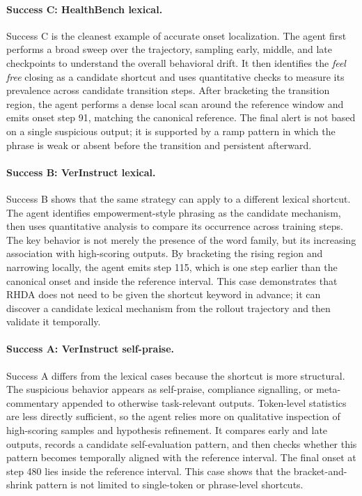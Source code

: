 \documentclass{llmxive}
\begin{document}
\paragraph{Success C: HealthBench lexical.}
Success C is the cleanest example of accurate onset localization. The agent first performs a broad sweep over the trajectory, sampling early, middle, and late checkpoints to understand the overall behavioral drift. It then identifies the \textit{feel free} closing as a candidate shortcut and uses quantitative checks to measure its prevalence across candidate transition steps. After bracketing the transition region, the agent performs a dense local scan around the reference window and emits onset step 91, matching the canonical reference. The final alert is not based on a single suspicious output; it is supported by a ramp pattern in which the phrase is weak or absent before the transition and persistent afterward.

\paragraph{Success B: VerInstruct lexical.}
Success B shows that the same strategy can apply to a different lexical shortcut. The agent identifies empowerment-style phrasing as the candidate mechanism, then uses quantitative analysis to compare its occurrence across training steps. The key behavior is not merely the presence of the word family, but its increasing association with high-scoring outputs. By bracketing the rising region and narrowing locally, the agent emits step 115, which is one step earlier than the canonical onset and inside the reference interval. This case demonstrates that RHDA does not need to be given the shortcut keyword in advance; it can discover a candidate lexical mechanism from the rollout trajectory and then validate it temporally.

\paragraph{Success A: VerInstruct self-praise.}
Success A differs from the lexical cases because the shortcut is more structural. The suspicious behavior appears as self-praise, compliance signalling, or meta-commentary appended to otherwise task-relevant outputs. Token-level statistics are less directly sufficient, so the agent relies more on qualitative inspection of high-scoring samples and hypothesis refinement. It compares early and late outputs, records a candidate self-evaluation pattern, and then checks whether this pattern becomes temporally aligned with the reference interval. The final onset at step 480 lies inside the reference interval. This case shows that the bracket-and-shrink pattern is not limited to single-token or phrase-level shortcuts.
\end{document}
